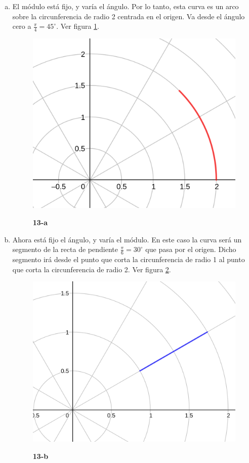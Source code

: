 \documentclass{article}
\begin{document}
\begin{enumerate}[(a)]
\item El módulo está fijo, y varía el ángulo. Por lo tanto, esta curva es un arco sobre la circunferencia de radio 2 centrada en el origen. Va desde el ángulo cero a $\frac{\pi}{4} = 45^{\circ}$. Ver figura \ref{fig:1-13-a}.

\begin{figure}[ht]
\caption{\textbf{13-a}}
\includegraphics[scale=1.4]{img/ejercicios/1/13-a.png} 
\centering
\label{fig:1-13-a}
\end{figure}

\item Ahora está fijo el ángulo, y varía el módulo. En este caso la curva será un segmento de la recta de pendiente $\frac{\pi}{6}= 30^{\circ}$ que pasa por el origen. Dicho segmento irá desde el punto que corta la circunferencia de radio 1 al punto que corta la circunferencia de radio 2. Ver figura \ref{fig:1-13-b}.

\begin{figure}[ht]
\caption{\textbf{13-b}}
\includegraphics[scale=2.35]{img/ejercicios/1/13-b.png} 
\centering
\label{fig:1-13-b}
\end{figure}


\end{enumerate}
\end{document}
